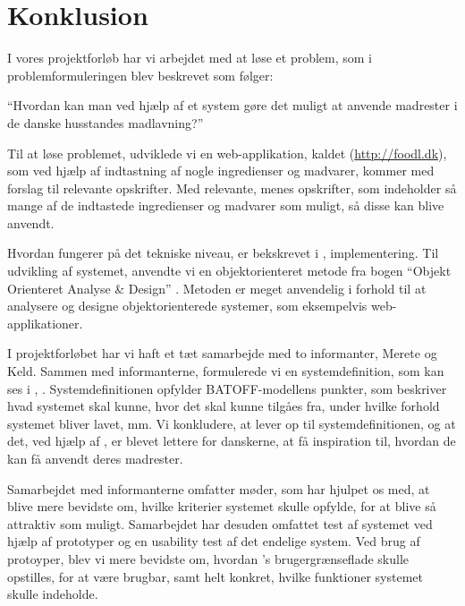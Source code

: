 \chapter{Konklusion}
\label{chap:konklusion}

I vores projektforløb har vi arbejdet med at løse et problem, som i problemformuleringen blev beskrevet som følger:

``Hvordan kan man ved hjælp af et system gøre det muligt at anvende madrester i de danske husstandes madlavning?''

Til at løse problemet, udviklede vi en web-applikation, kaldet \Foodl{} (\url{http://foodl.dk}), som ved hjælp af indtastning af nogle ingredienser og madvarer, kommer med forslag til relevante opskrifter. Med relevante, menes opskrifter, som indeholder så mange af de indtastede ingredienser og madvarer som muligt, så disse kan blive anvendt.

Hvordan \Foodl{} fungerer på det tekniske niveau, er bekskrevet i , implementering. Til udvikling af systemet, anvendte vi en objektorienteret metode fra bogen ``Objekt Orienteret Analyse \& Design'' \cite{ooad}. Metoden er meget anvendelig i forhold til at analysere og designe objektorienterede systemer, som eksempelvis web-applikationer. 

I projektforløbet har vi haft et tæt samarbejde med to informanter, Merete og Keld. Sammen med informanterne, formulerede vi en systemdefinition, som kan ses i , . Systemdefinitionen opfylder BATOFF-modellens punkter, som beskriver hvad systemet skal kunne, hvor det skal kunne tilgåes fra, under hvilke forhold systemet bliver lavet, mm. Vi konkludere, at \Foodl{} lever op til systemdefinitionen, og at det, ved hjælp af \Foodl{}, er blevet lettere for danskerne, at få inspiration til, hvordan de kan få anvendt deres madrester.

Samarbejdet med informanterne omfatter møder, som har hjulpet os med, at blive mere bevidste om, hvilke kriterier systemet skulle opfylde, for at blive så attraktiv som muligt. Samarbejdet har desuden omfattet test af systemet ved hjælp af prototyper og en usability test af det endelige system. Ved brug af protoyper, blev vi mere bevidste om, hvordan \Foodl{}'s brugergrænseflade skulle opstilles, for at være brugbar, samt helt konkret, hvilke funktioner systemet skulle indeholde.

